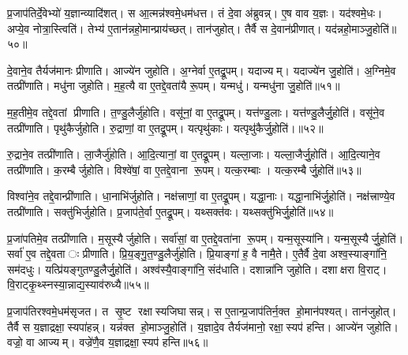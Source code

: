 
प्र॒जाप॑तिर्दे॒वेभ्यो॑ य॒ज्ञान्व्यादि॑शत्। स आ॒त्मन्न॑श्वमे॒धम॑धत्त। तं दे॒वा अ॑ब्रुवन्न्। ए॒ष वाव य॒ज्ञः। यद॑श्वमे॒धः। अप्ये॒व नोत्रा॒स्त्विति॑। तेभ्य॑ ए॒तान॑न्नहो॒मान्प्राय॑च्छत्। तान॑जुहोत्। तैर्वै स दे॒वान॑प्रीणात्। यद॑न्नहो॒माञ्जु॒होति॑॥५०॥

दे॒वाने॒व तैर्यज॑मानः प्रीणाति। आज्ये॑न जुहोति। अ॒ग्नेर्वा ए॒तद्रू॒पम्। यदाज्यम्। यदाज्ये॑न जु॒होति॑। अ॒ग्निमे॒व तत्प्री॑णाति। मधु॑ना जुहोति। म॒ह॒त्यै वा ए॒तद्दे॒वता॑यै रू॒पम्। यन्मधु॑। यन्मधु॑ना जु॒होति॑॥५१॥

म॒ह॒तीमे॒व तद्दे॒वतां प्रीणाति। त॒ण्डु॒लैर्जु॑होति। वसू॑नां॒ वा ए॒तद्रू॒पम्। यत्त॑ण्डु॒लाः। यत्त॑ण्डु॒लैर्जु॒होति॑। वसू॑ने॒व तत्प्री॑णाति। पृथु॑कैर्जुहोति। रु॒द्राणां॒ वा ए॒तद्रू॒पम्। यत्पृथु॑काः। यत्पृथु॑कैर्जु॒होति॑।॥५२॥

रु॒द्राने॒व तत्प्री॑णाति। ला॒जैर्जु॑होति। आ॒दि॒त्यानां॒ वा ए॒तद्रू॒पम्। यल्ला॒जाः। यल्ला॒जैर्जु॒होति॑। आ॒दि॒त्याने॒व तत्प्री॑णाति। क॒रम्बैर्जुहोति। विश्वे॑षां॒ वा ए॒तद्दे॒वाना रू॒पम्। यत्क॒रम्बाः। यत्क॒रम्बैर्जु॒होति॑॥५३॥

विश्वा॑ने॒व तद्दे॒वान्प्री॑णाति। धा॒नाभि॑र्जुहोति। नक्ष॑त्त्राणां॒ वा ए॒तद्रू॒पम्। यद्धा॒नाः। यद्धा॒नाभि॑र्जु॒होति॑। नक्ष॑त्त्राण्ये॒व तत्प्री॑णाति। सक्तु॑भिर्जुहोति। प्र॒जाप॑ते॒र्वा ए॒तद्रू॒पम्। यथ्सक्त॑वः। यथ्सक्तु॑भिर्जु॒होति॑॥५४॥

प्र॒जा॑पतिमे॒व तत्प्री॑णाति। म॒सूस्यैर्जुहोति। सर्वा॑सां॒ वा ए॒तद्दे॒वता॑ना रू॒पम्। यन्म॒सूस्या॑नि। यन्म॒सूस्यैर्जु॒होति॑। सर्वा॑ ए॒व तद्दे॒वताः प्रीणाति। प्रि॒य॒ङ्गु॒त॒ण्डु॒लैर्जु॑होति। प्रि॒याङ्गा॑ ह॒ वै नामै॒ते। ए॒तैर्वै दे॒वा अश्व॒स्याङ्गा॑नि॒ सम॑दधुः। यत्प्रि॑यङ्गुतण्डु॒लैर्जु॒होति॑। अश्व॑स्यै॒वाङ्गा॑नि॒ संद॑धाति। दशान्ना॑नि जुहोति। दशाक्षरा वि॒राट्। वि॒राट्कृ॒थ्स्नस्या॒न्नाद्य॒स्याव॑रुध्यै॥५५॥


प्र॒जाप॑तिरश्वमे॒धम॑सृजत। त सृ॒ष्ट रक्षास्यजिघासन्न्। स ए॒तान्प्र॒जाप॑तिर्न॒क्त हो॒मान॑पश्यत्। तान॑जुहोत्। तैर्वै स य॒ज्ञाद्रक्षा॒स्यपा॑हन्न्। यन्न॑क्त हो॒माञ्जु॒होति॑। य॒ज्ञादे॒व तैर्यज॑मानो॒ रक्षा॒स्यप॑ हन्ति। आज्ये॑न जुहोति। वज्रो॒ वा आज्यम्। वज्रे॑णै॒व य॒ज्ञाद्रक्षा॒स्यप॑ हन्ति॥५६॥

